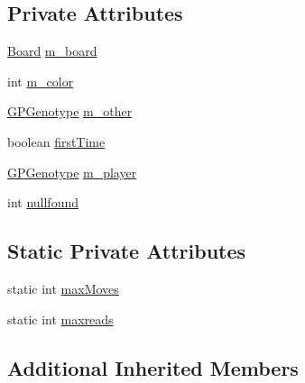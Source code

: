 \subsection*{Private Attributes}
\begin{DoxyCompactItemize}
\item 
\hyperlink{classexamples_1_1gp_1_1tictactoe_1_1_board}{Board} \hyperlink{classexamples_1_1gp_1_1tictactoe_1_1_tic_tac_toe_main_1_1_game_fitness_function_af84481dbececd35cce4ae5c2e59c7c93}{m\-\_\-board}
\item 
int \hyperlink{classexamples_1_1gp_1_1tictactoe_1_1_tic_tac_toe_main_1_1_game_fitness_function_ac700ce92d0ec7f10172031b4d6638a22}{m\-\_\-color}
\item 
\hyperlink{classorg_1_1jgap_1_1gp_1_1impl_1_1_g_p_genotype}{G\-P\-Genotype} \hyperlink{classexamples_1_1gp_1_1tictactoe_1_1_tic_tac_toe_main_1_1_game_fitness_function_a2c97289d3f37af16083b46266ed7d73f}{m\-\_\-other}
\item 
boolean \hyperlink{classexamples_1_1gp_1_1tictactoe_1_1_tic_tac_toe_main_1_1_game_fitness_function_a18f8018b67aae2eae61134de8a4c5f2f}{first\-Time}
\item 
\hyperlink{classorg_1_1jgap_1_1gp_1_1impl_1_1_g_p_genotype}{G\-P\-Genotype} \hyperlink{classexamples_1_1gp_1_1tictactoe_1_1_tic_tac_toe_main_1_1_game_fitness_function_a870c0216f24691ff7f275a905d2cdb58}{m\-\_\-player}
\item 
int \hyperlink{classexamples_1_1gp_1_1tictactoe_1_1_tic_tac_toe_main_1_1_game_fitness_function_a4744a6b1ab6db4cb9e01de7a40c6e9f4}{nullfound}
\end{DoxyCompactItemize}
\subsection*{Static Private Attributes}
\begin{DoxyCompactItemize}
\item 
static int \hyperlink{classexamples_1_1gp_1_1tictactoe_1_1_tic_tac_toe_main_1_1_game_fitness_function_a39a1ac57a7d2b5a6cfee1f66027c81ce}{max\-Moves}
\item 
static int \hyperlink{classexamples_1_1gp_1_1tictactoe_1_1_tic_tac_toe_main_1_1_game_fitness_function_adb0cabead09aa776a26dd7fb42b3f601}{maxreads}
\end{DoxyCompactItemize}
\subsection*{Additional Inherited Members}


